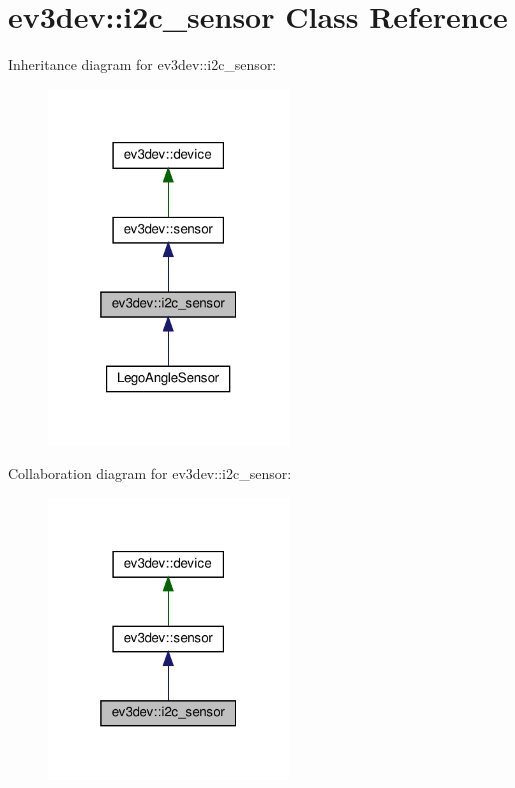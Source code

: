 \hypertarget{classev3dev_1_1i2c__sensor}{}\section{ev3dev\+:\+:i2c\+\_\+sensor Class Reference}
\label{classev3dev_1_1i2c__sensor}


Inheritance diagram for ev3dev\+:\+:i2c\+\_\+sensor\+:
\nopagebreak
\begin{figure}[H]
\begin{center}
\leavevmode
\includegraphics[width=181pt]{classev3dev_1_1i2c__sensor__inherit__graph}
\end{center}
\end{figure}


Collaboration diagram for ev3dev\+:\+:i2c\+\_\+sensor\+:
\nopagebreak
\begin{figure}[H]
\begin{center}
\leavevmode
\includegraphics[width=181pt]{classev3dev_1_1i2c__sensor__coll__graph}
\end{center}
\end{figure}
